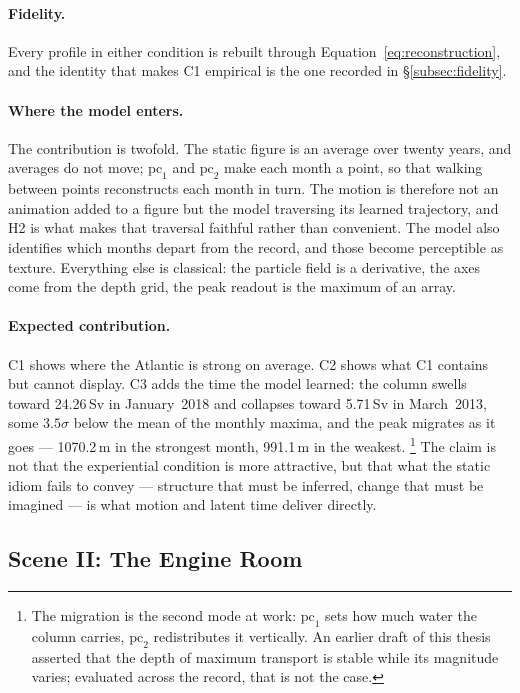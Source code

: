 \paragraph{Fidelity.} Every profile in either condition is rebuilt through Equation~\ref{eq:reconstruction}, and the identity that makes C1 empirical is the one recorded in \S\ref{subsec:fidelity}.

\paragraph{Where the model enters.} The contribution is twofold. The static figure is an average over twenty years, and averages do not move; $\mathrm{pc}_1$ and $\mathrm{pc}_2$ make each month a point, so that walking between points reconstructs each month in turn. The motion is therefore not an animation added to a figure but the model traversing its learned trajectory, and H2 is what makes that traversal faithful rather than convenient. The model also identifies which months depart from the record, and those become perceptible as texture. Everything else is classical: the particle field is a derivative, the axes come from the depth grid, the peak readout is the maximum of an array.

\paragraph{Expected contribution.} C1 shows where the Atlantic is strong on average. C2 shows what C1 contains but cannot display. C3 adds the time the model learned: the column swells toward 24.26\,Sv in January~2018 and collapses toward 5.71\,Sv in March~2013, some $3.5\sigma$ below the mean of the monthly maxima, and the peak migrates as it goes --- 1070.2\,m in the strongest month, 991.1\,m in the weakest.
\footnote{The migration is the second mode at work: $\mathrm{pc}_1$ sets how much water the column carries, $\mathrm{pc}_2$ redistributes it vertically. An earlier draft of this thesis asserted that the depth of maximum transport is stable while its magnitude varies; evaluated across the record, that is not the case.} The claim is not that the experiential condition is more attractive, but that what the static idiom fails to convey --- structure that must be inferred, change that must be imagined --- is what motion and latent time deliver directly.

\subsection{Scene II: The Engine Room}
\label{subsec:scene-engine}

